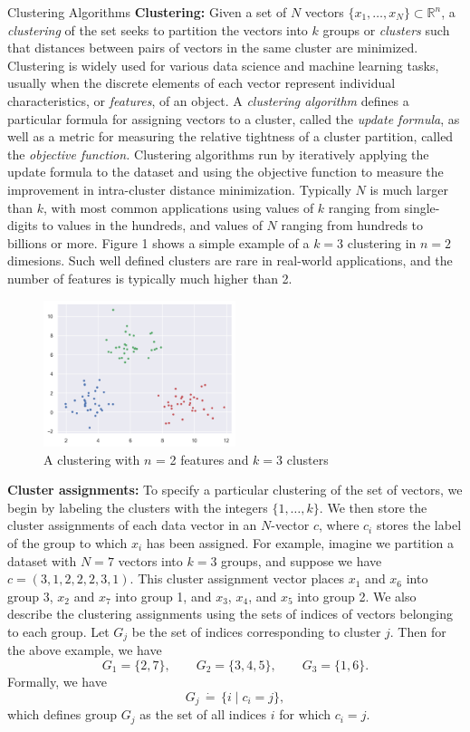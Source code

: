 \documentclass{article}
\begin{document}
\begin{section}{Clustering Algorithms}
\textbf{Clustering:} Given a set of $N$ vectors $\{x_{1},\ldots,x_{N}\}\subset\mathbb{R}^{n}$,  a \textit{clustering} of the set seeks to partition the vectors into $k$ groups or \textit{clusters} such that distances between pairs of vectors in the same cluster are minimized. Clustering is widely used for various data science and machine learning tasks,  usually when the discrete elements of each vector represent individual characteristics, or \textit{features}, of an object. A \textit{clustering algorithm} defines a particular formula for assigning vectors to a cluster, called the \textit{update formula}, as well as a metric for measuring the relative tightness of a cluster partition,  called the \textit{objective function.} Clustering algorithms run by iteratively applying the update formula to the dataset and using the objective function to measure the improvement in intra-cluster distance minimization.  Typically $N$ is much larger than $k$, with most common applications using values of $k$ ranging from single-digits to values in the hundreds, and values of $N$ ranging from hundreds to billions or more.  Figure 1 shows a simple example of a $k=3$ clustering in $n=2$ dimesions. Such well defined clusters are rare in real-world applications, and the number of features is typically  much higher than 2. 

\begin{figure}[h!]
 \centering
  \includegraphics[width=0.5\textwidth]{example_cluster.png}
 \caption{A clustering with $n$ = 2 features and $k=3$ clusters}
 \end{figure}

\textbf{Cluster assignments:} To specify a particular clustering of the set of vectors, we begin by labeling the clusters with the integers $\{1,\ldots,k\}$. We then store the cluster assignments of each data vector in an $N$-vector $c$, where $c_{i}$ stores the label of the group to which $x_{i}$ has been assigned. For example, imagine we partition a dataset with $N=7$ vectors into $k=3$ groups, and suppose we have $c=(3,1,2,2,2,3,1)$. This cluster assignment vector places $x_{1}$ and $x_{6}$ into group 3, $x_{2}$ and $x_{7}$ into group 1, and $x_{3}$, $x_{4}$, and $x_{5}$ into group 2. We also describe the clustering assignments using the sets of indices of vectors belonging to each group. Let $G_{j}$ be the set of indices corresponding to cluster $j$. Then for the above example, we have
\[G_{1} = \{2,7\},\qquad G_{2} = \{3,4,5\},\qquad G_{3} = \{1,6\}.\]
Formally, we have 
\[G_{j}\,\dot{=}\,\{i \mid c_{i} = j\},\]
which defines group $G_{j}$ as the set of all indices $i$ for which $c_{i} = j$.\\


\end{section}
\end{document}
